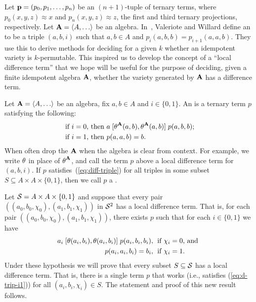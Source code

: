 Let $\mathbf{p} = (p_0, p_1, \dots, p_n)$ be an $(n+1)$-tuple of ternary terms, where
$p_0(x,y,z) \approx x$ and $p_n(x,y,z) \approx z$, the first and third
ternary projections, respectively. 
Let $\bA=\< A, \dots\>$ be an algebra.
In~\cite{MR3239624},
Valeriote and Willard define an 
to be a triple $(a,b,i)$ such that $a, b \in A$ and
$p_i(a,b,b) = p_{i+1}(a,a,b)$. They use this to derive methods for deciding
for a given $k$ whether an idempotent variety is $k$-permutable.
This inspired us to develop the concept of a ``local difference term'' that we
hope will be useful for the
purpose of deciding, given a finite idempotent algebra $\mathbf{A}$, whether the variety
generated by $\mathbf{A}$ has a difference term.

Let $\bA=\< A, \dots\>$ be an algebra, fix $a, b \in A$ and
$i \in \{0,1\}$.
An
 is a ternary term $p$ satisfying the following:
\begin{align}
\text{ if $i=0$, then } & a \comm{\Cg^{\bA}(a,b)}{\Cg^{\bA}(a,b)} p(a,b,b); \label{eq:diff-triple}\\
\text{ if $i=1$, then } &p(a,a,b) = b. \nonumber
\end{align}
When often drop the
$\mathbf{A}$ when the algebra is clear from context.
For example, we write $\operatorname{\theta}$ in place of $\operatorname{\theta}^{\mathbf{A}}$, and 
call the term $p$ above a local difference term for 
$(a,b,i)$.
If $p$ satisfies~(\ref{eq:diff-triple}) for all triples
in some subset $S\subseteq A \times A \times \{0,1\}$, then we call $p$
a .

Let 
$\mathcal{S} = A \times A \times \{0,1\}$ and
suppose that every pair
$((a_0, b_0, \chi_0), (a_1, b_1, \chi_1))$
in $\mathcal{S}^2$ has a local difference term.
That is, for each pair $((a_0, b_0, \chi_0), (a_1, b_1, \chi_1))$, there exists
$p$ such that for each $i \in \{0,1\}$ we have
\begin{align}
  a_i \comm{\Cg(a_i,b_i)}{\Cg(a_i,b_i)} p(a_i,b_i,b_i), & \;
  \text{ if $\chi_i=0$, and }  \label{eq:d-trip-i1}\\
  p(a_i,a_i,b_i) =b_i, & \;
  \text{ if $\chi_i=1$.}\nonumber
\end{align}
Under these hypothesis we will prove that every subset $S\subseteq \mathcal{S}$
has a local difference term.
That is, there is a single term $p$ that works (i.e., satisfies
(\ref{eq:d-trip-i1})) for all $(a_i, b_i, \chi_i) \in S$.
The statement and proof of this new result follows.

